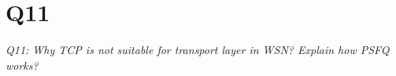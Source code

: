 \chapter{Q11}
\emph{Q11: Why TCP is not suitable for transport layer in WSN? Explain how PSFQ
works?}
